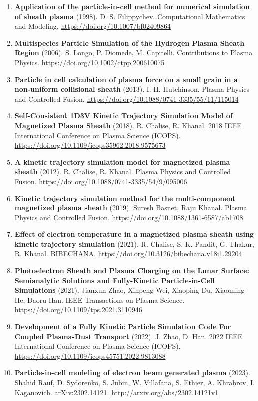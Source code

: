 \documentclass[11pt,a4paper]{article}
\begin{document}
\begin{enumerate}[leftmargin=1.4em]
\item \textbf{Application of the particle-in-cell method for numerical simulation of sheath plasma} (1998). D. S. Filippychev. Computational Mathematics and Modeling. \url{https://doi.org/10.1007/bf02409864}
\item \textbf{Multispecies Particle Simulation of the Hydrogen Plasma Sheath Region} (2006). S. Longo, P. Diomede, M. Capitelli. Contributions to Plasma Physics. \url{https://doi.org/10.1002/ctpp.200610075}
\item \textbf{Particle in cell calculation of plasma force on a small grain in a non-uniform collisional sheath} (2013). I. H. Hutchinson. Plasma Physics and Controlled Fusion. \url{https://doi.org/10.1088/0741-3335/55/11/115014}
\item \textbf{Self-Consistent 1D3V Kinetic Trajectory Simulation Model of Magnetized Plasma Sheath} (2018). R. Chalise, R. Khanal. 2018 IEEE International Conference on Plasma Science (ICOPS). \url{https://doi.org/10.1109/icops35962.2018.9575673}
\item \textbf{A kinetic trajectory simulation model for magnetized plasma sheath} (2012). R. Chalise, R. Khanal. Plasma Physics and Controlled Fusion. \url{https://doi.org/10.1088/0741-3335/54/9/095006}
\item \textbf{Kinetic trajectory simulation method for the multi-component magnetized plasma sheath} (2019). Suresh Basnet, Raju Khanal. Plasma Physics and Controlled Fusion. \url{https://doi.org/10.1088/1361-6587/ab1708}
\item \textbf{Effect of electron temperature in a magnetized plasma sheath using kinetic trajectory simulation} (2021). R. Chalise, S. K. Pandit, G. Thakur, R. Khanal. BIBECHANA. \url{https://doi.org/10.3126/bibechana.v18i1.29204}
\item \textbf{Photoelectron Sheath and Plasma Charging on the Lunar Surface: Semianalytic Solutions and Fully-Kinetic Particle-in-Cell Simulations} (2021). Jianxun Zhao, Xinpeng Wei, Xiaoping Du, Xiaoming He, Daoru Han. IEEE Transactions on Plasma Science. \url{https://doi.org/10.1109/tps.2021.3110946}
\item \textbf{Development of a Fully Kinetic Particle Simulation Code For Coupled Plasma-Dust Transport} (2022). J. Zhao, D. Han. 2022 IEEE International Conference on Plasma Science (ICOPS). \url{https://doi.org/10.1109/icops45751.2022.9813088}
\item \textbf{Particle-in-cell modeling of electron beam generated plasma} (2023). Shahid Rauf, D. Sydorenko, S. Jubin, W. Villafana, S. Ethier, A. Khrabrov, I. Kaganovich. arXiv:2302.14121. \url{http://arxiv.org/abs/2302.14121v1}

\end{enumerate}
\end{document}
